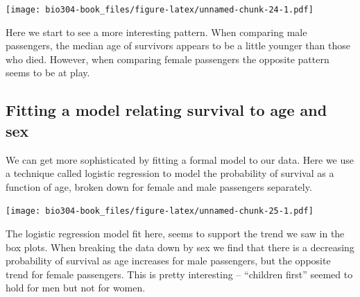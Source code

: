 \documentclass[]{book}
\newenvironment{Shaded}{\begin{snugshade}}{\end{snugshade}}
\newcommand{\DataTypeTok}[1]{\textcolor[rgb]{0.13,0.29,0.53}{#1}}
\newcommand{\FloatTok}[1]{\textcolor[rgb]{0.00,0.00,0.81}{#1}}
\newcommand{\KeywordTok}[1]{\textcolor[rgb]{0.13,0.29,0.53}{\textbf{#1}}}
\newcommand{\NormalTok}[1]{#1}
\newcommand{\OperatorTok}[1]{\textcolor[rgb]{0.81,0.36,0.00}{\textbf{#1}}}
\newcommand{\StringTok}[1]{\textcolor[rgb]{0.31,0.60,0.02}{#1}}
\theoremstyle{definition}
\theoremstyle{definition}
\theoremstyle{definition}
\theoremstyle{remark}
\begin{document}
\texttt{[image: bio304-book\_files/figure-latex/unnamed-chunk-24-1.pdf]}

Here we start to see a more interesting pattern. When comparing male
passengers, the median age of survivors appears to be a little younger
than those who died. However, when comparing female passengers the
opposite pattern seems to be at play.

\hypertarget{fitting-a-model-relating-survival-to-age-and-sex}{%
\subsection{Fitting a model relating survival to age and
sex}\label{fitting-a-model-relating-survival-to-age-and-sex}}

We can get more sophisticated by fitting a formal model to our data.
Here we use a technique called logistic regression to model the
probability of survival as a function of age, broken down for female and
male passengers separately.

\begin{Shaded}
\end{Shaded}

\texttt{[image: bio304-book\_files/figure-latex/unnamed-chunk-25-1.pdf]}

The logistic regression model fit here, seems to support the trend we
saw in the box plots. When breaking the data down by sex we find that
there is a decreasing probability of survival as age increases for male
passengers, but the opposite trend for female passengers. This is pretty
interesting -- ``children first'' seemed to hold for men but not for
women.
\end{document}
